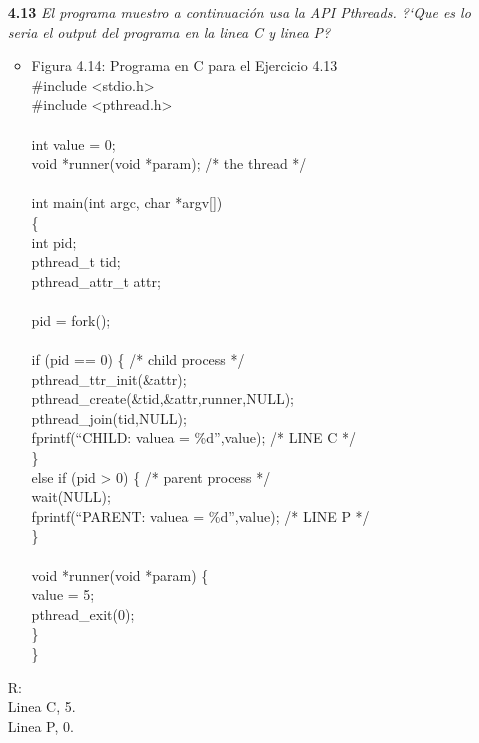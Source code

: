 \begin{itemize}
\item[\textbf{4.13}]\emph{ El programa muestro a continuaci\'on usa la API Pthreads. ?`Que es lo seria el output del programa en la linea C y linea P?}
	\begin{itemize}
	\item Figura 4.14: Programa en C para el Ejercicio 4.13\\
\#include <stdio.h>\\
\#include <pthread.h>\\
\\
int value = 0;\\
void *runner(void *param); /* the thread */\\
\\
int main(int argc, char *argv[])\\
\{\\
	int pid;\\
	pthread\_t tid;\\
	pthread\_attr\_t attr;\\
	\\
	pid = fork();\\
	\\
	if (pid == 0) \{ /* child process */\\
		pthread\_ttr\_init(\&attr);\\
		pthread\_create(\&tid,\&attr,runner,NULL);\\
		pthread\_join(tid,NULL);\\
		fprintf(``CHILD: valuea = \%d'',value); /* LINE C */\\
	\}\\
	else if (pid > 0) \{ /* parent process */\\
		wait(NULL);\\
		fprintf(``PARENT: valuea = \%d'',value); /* LINE P */\\
	\}\\
	\\
	void *runner(void *param) \{\\
		value = 5;\\
		pthread\_exit(0);\\
	\}\\
\}
	\end{itemize}
R:\\
Linea C, 5.\\
Linea P, 0.\\

\end{itemize}
